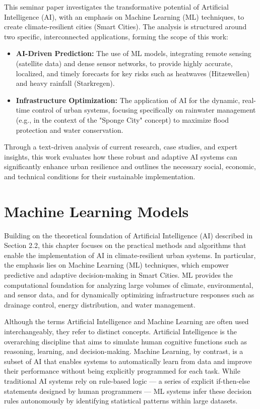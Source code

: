 \documentclass[12pt]{article}
\begin{document}
This seminar paper investigates the transformative potential of Artificial Intelligence (AI), with an 
emphasis on Machine Learning (ML) techniques, to create climate-resilient cities (Smart Cities). The analysis is 
structured around two specific, interconnected applications, forming the scope of this work:
\begin{itemize}
    \item \textbf{AI-Driven Prediction:} The use of ML models, integrating remote sensing (satellite data) and dense sensor networks,
to provide highly accurate, localized, and timely forecasts for key risks such as heatwaves (Hitzewellen) and heavy 
rainfall (Starkregen).

    \item \textbf{Infrastructure Optimization:} The application of AI for the dynamic, real-time control of urban systems, focusing
specifically on rainwater management (e.g., in the context of the "Sponge City" concept) to maximize flood protection
and water conservation.
\end{itemize} 
Through a text-driven analysis of current research, case studies, and expert insights, this work evaluates how these 
robust and adaptive AI systems can significantly enhance urban resilience and outlines the necessary social, economic, 
and technical conditions for their sustainable implementation.
\section{Machine Learning Models}
Building on the theoretical foundation of Artificial Intelligence (AI) described in Section 2.2, this chapter focuses on 
the practical methods and algorithms that enable the implementation of AI in climate-resilient urban systems.
In particular, the emphasis lies on Machine Learning (ML) techniques, which empower predictive and adaptive decision-making 
in Smart Cities. ML provides the computational foundation for analyzing large volumes of climate, environmental, and sensor 
data, and for dynamically optimizing infrastructure responses such as drainage control, energy distribution, and water management.

Although the terms Artificial Intelligence and Machine Learning are often used interchangeably, they refer to distinct concepts. 
Artificial Intelligence is the overarching discipline that aims to simulate human cognitive functions such as reasoning, learning, 
and decision-making. Machine Learning, by contrast, is a subset of AI that enables systems to automatically learn from data and 
improve their performance without being explicitly programmed for each task.
While traditional AI systems rely on rule-based logic — a series of explicit if-then-else statements designed by human 
programmers — ML systems infer these decision rules autonomously by identifying statistical patterns within large datasets.
\end{document}
